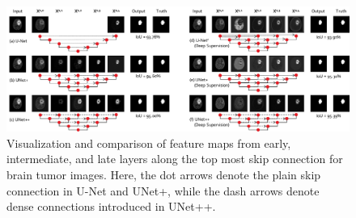 
\begin{figure}
\begin{center}
\includegraphics[width=1.0\columnwidth]{Figures/CH4/fig_feature_map_aggregation_brats.pdf}
\end{center}
\caption[Visualization of Multi-scale Feature Map Aggregation]{Visualization and comparison of feature maps from early, intermediate, and late layers along the top most skip connection for brain tumor images. Here, the dot arrows denote the plain skip connection in U-Net and UNet+, while the dash arrows denote dense connections introduced in UNet++.}
\label{ch4:fig:feature_map_aggregation}
\end{figure}



